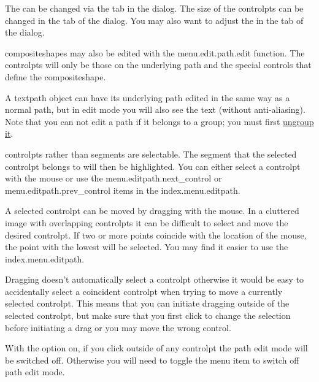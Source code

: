 \begin{information}
The  can be changed via the 
tab in the  dialog. The size of the
\glspl{controlpt} can be changed in the  tab
of the  dialog. You may also want to adjust the
 in the  tab of the
 dialog.
\end{information}

\Glspl{compositeshape} may also be edited with 
the \gls{menu.edit.path.edit} function. The
\glspl{controlpt} will only be those on the underlying path and 
the special controls that define the \gls{compositeshape}.

A \gls{textpath} object can have its underlying path edited in the
same way as a normal \gls{path}, but in edit mode you will also see
the text (without \gls{anti-aliasing}).  Note that you can not edit
a \gls{path} if it belongs to a \gls{group}; you must first
\hyperref[sec:grouping]{ungroup it}.

\begin{information}
\Glspl{controlpt} rather than segments are selectable. The segment
that the selected \gls{controlpt} belongs to will then be
highlighted. You can either select a \gls{controlpt} with the mouse
or use the \gls{menu.editpath.next_control} or \gls{menu.editpath.prev_control}
items in the \gls{index.menu.editpath}.
\end{information}

A selected \gls{controlpt} can be moved by dragging with the mouse.
In a cluttered image with overlapping \glspl{controlpt} it can be
difficult to select and move the desired \gls{controlpt}.
If two or more points coincide
with the location of the mouse, the point with the lowest
 will be selected.
You may find it easier to use the \gls{index.menu.editpath}.

Dragging doesn't automatically select a \gls{controlpt} otherwise it
would be easy to accidentally select a coincident \gls{controlpt}
when trying to move a currently selected \gls{controlpt}.
This means that you can initiate dragging outside of the selected
\gls*{controlpt}, but make sure that you
first click to change the selection before initiating a drag or you
may move the wrong control.

\begin{important}
With the  option on, if you
click outside of any \gls{controlpt} the path edit mode will be
switched off. Otherwise you will need to toggle the
 menu item to switch off path edit mode.
\end{important}

